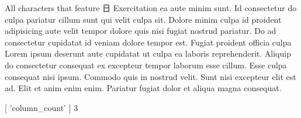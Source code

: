 




{\mktsHTwo{}All characters that feature {\cjk{}日}\mktsHTwoBeg}%
Exercitation ea aute minim sunt. Id consectetur do culpa pariatur cillum sunt qui velit culpa sit. Dolore minim culpa id proident adipisicing aute velit tempor dolore quis nisi fugiat nostrud pariatur. Do ad consectetur cupidatat id veniam dolore tempor est. Fugiat proident officia culpa Lorem ipsum deserunt aute cupidatat ut culpa ea laboris reprehenderit. Aliquip do consectetur consequat ex excepteur tempor laborum esse cillum. Esse culpa consequat nisi ipsum. Commodo quis in nostrud velit. Sunt nisi excepteur elit est ad. Elit et anim enim enim. Pariatur fugiat dolor et aliqua magna consequat.





[ 'column\_count' ]
3



